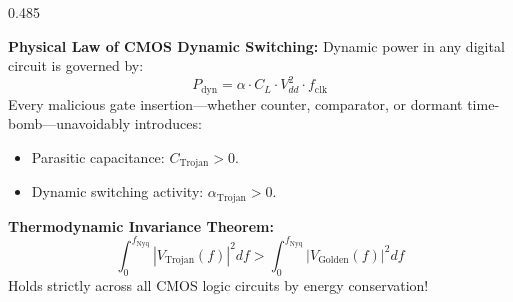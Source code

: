 \documentclass[aspectratio=169,11pt]{beamer}
\begin{document}
\begin{frame}[t]
  \vspace*{-0.18cm}

  \begin{columns}[T, onlytextwidth]
    \begin{column}{0.485\textwidth}
      \begin{glassbox}[top=2pt, bottom=2pt, left=6pt, right=6pt, title={First-Principles Physical Formulation}]{}
        \textbf{Physical Law of CMOS Dynamic Switching:}
        Dynamic power in any digital circuit is governed by:
        {\setlength{\abovedisplayskip}{1.0pt}\setlength{\belowdisplayskip}{1.0pt}
        \begin{equation*}
          P_{\text{dyn}} = \alpha \cdot C_L \cdot V_{dd}^2 \cdot f_{\text{clk}}
        \end{equation*}}
        Every malicious gate insertion—whether counter, comparator, or dormant time-bomb—unavoidably introduces:
        \begin{itemize}\setlength{\itemsep}{1.0pt}
          \item Parasitic capacitance: $C_{\text{Trojan}} > 0$.
          \item Dynamic switching activity: $\alpha_{\text{Trojan}} > 0$.
        \end{itemize}
        \textbf{Thermodynamic Invariance Theorem:}
        {\setlength{\abovedisplayskip}{1.0pt}\setlength{\belowdisplayskip}{1.0pt}
        \begin{equation*}
          \int_0^{f_{\text{Nyq}}} |V_{\text{Trojan}}(f)|^2 df > \int_0^{f_{\text{Nyq}}} |V_{\text{Golden}}(f)|^2 df
        \end{equation*}}
        Holds strictly across all CMOS logic circuits by energy conservation!
      \end{glassbox}
    \end{column}


\end{columns}
\end{frame}
\end{document}
